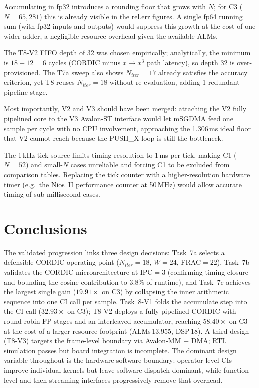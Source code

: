 \documentclass[a4paper,10pt,twocolumn]{article}
\begin{document}
Accumulating in fp32 introduces a rounding floor that grows with $N$; for C3 ($N=65{,}281$) this is already visible in the rel.err figures. A single fp64 running sum (with fp32 inputs and outputs) would suppress this growth at the cost of one wider adder, a negligible resource overhead given the available ALMs.

The T8-V2 FIFO depth of 32 was chosen empirically; analytically, the minimum is $18-12=6$ cycles (CORDIC minus $x{\to}x^3$ path latency), so depth 32 is over-provisioned. The T7a sweep also shows $N_{iter}=17$ already satisfies the accuracy criterion, yet T8 reuses $N_{iter}=18$ without re-evaluation, adding 1 redundant pipeline stage.

Most importantly, V2 and V3 should have been merged: attaching the V2 fully pipelined core to the V3 Avalon-ST interface would let mSGDMA feed one sample per cycle with no CPU involvement, approaching the 1.306\,ms ideal floor that V2 cannot reach because the PUSH\_X loop is still the bottleneck.

The 1\,kHz tick source limits timing resolution to 1\,ms per tick, making C1 ($N=52$) and small-$N$ cases unreliable and forcing C1 to be excluded from comparison tables. Replacing the tick counter with a higher-resolution hardware timer (e.g.\ the Nios~II performance counter at 50\,MHz) would allow accurate timing of sub-millisecond cases.

\section{Conclusions}

The validated progression links three design decisions: Task~7a selects a defensible CORDIC operating point ($N_{iter}=18$, $W=24$, FRAC$=22$), Task~7b validates the CORDIC microarchitecture at IPC$=3$ (confirming timing closure and bounding the cosine contribution to 3.8\% of runtime), and Task~7c achieves the largest single gain ($19.91\times$ on C3) by collapsing the inner arithmetic sequence into one CI call per sample. Task~8-V1 folds the accumulate step into the CI call ($32.93\times$ on C3); T8-V2 deploys a fully pipelined CORDIC with round-robin FP stages and an interleaved accumulator, reaching $58.40\times$ on C3 at the cost of a larger resource footprint (ALMs\,13{,}955, DSP\,18). A third design (T8-V3) targets the frame-level boundary via Avalon-MM + DMA; RTL simulation passes but board integration is incomplete. The dominant design variable throughout is the hardware-software boundary: operator-level CIs improve individual kernels but leave software dispatch dominant, while function-level and then streaming interfaces progressively remove that overhead.

\FloatBarrier
\end{document}
